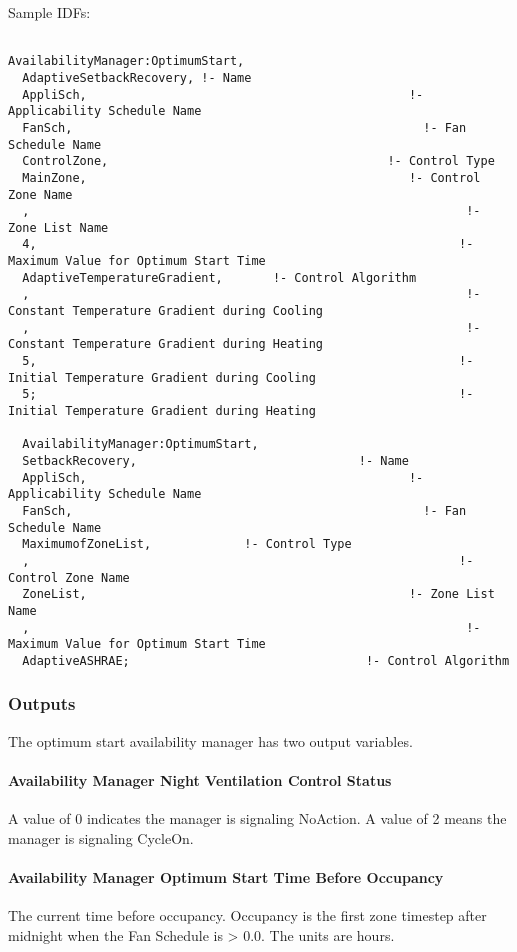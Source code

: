 Sample IDFs:

\begin{lstlisting}

AvailabilityManager:OptimumStart,
  AdaptiveSetbackRecovery, !- Name
  AppliSch,                                             !- Applicability Schedule Name
  FanSch,                                                 !- Fan Schedule Name
  ControlZone,                                       !- Control Type
  MainZone,                                             !- Control Zone Name
  ,                                                             !- Zone List Name
  4,                                                           !- Maximum Value for Optimum Start Time
  AdaptiveTemperatureGradient,       !- Control Algorithm
  ,                                                             !- Constant Temperature Gradient during Cooling
  ,                                                             !- Constant Temperature Gradient during Heating
  5,                                                           !- Initial Temperature Gradient during Cooling
  5;                                                           !- Initial Temperature Gradient during Heating

  AvailabilityManager:OptimumStart,
  SetbackRecovery,                               !- Name
  AppliSch,                                             !- Applicability Schedule Name
  FanSch,                                                 !- Fan Schedule Name
  MaximumofZoneList,             !- Control Type
  ,                                                            !- Control Zone Name
  ZoneList,                                             !- Zone List Name
  ,                                                             !- Maximum Value for Optimum Start Time
  AdaptiveASHRAE;                                 !- Control Algorithm
\end{lstlisting}

\subsubsection{Outputs}\label{outputs-10-007}

The optimum start availability manager has two output variables.

\paragraph{Availability Manager Night Ventilation Control Status}\label{availability-manager-night-ventilation-control-status-1}

A value of 0 indicates the manager is signaling NoAction. A value of 2 means the manager is signaling CycleOn.

\paragraph{Availability Manager Optimum Start Time Before Occupancy}\label{availability-manager-optimum-start-time-before-occupancy}

The current time before occupancy. Occupancy is the first zone timestep after midnight when the Fan Schedule is \textgreater{} 0.0. The units are hours.